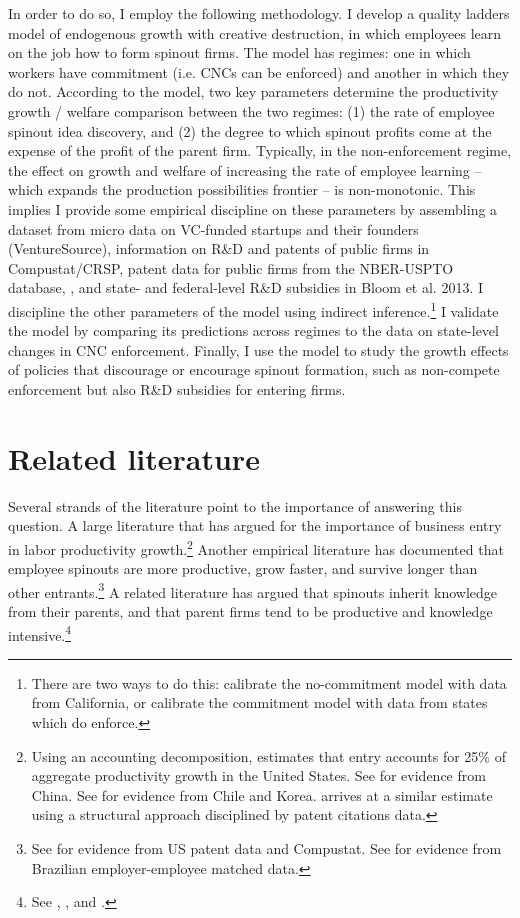\documentclass[11pt,english]{article}
\theoremstyle{remark}
\begin{document}
In order to do so, I employ the following methodology. I develop a quality ladders model of endogenous growth with creative destruction, in which employees learn on the job how to form spinout firms. The model has regimes: one in which workers have commitment (i.e. CNCs can be enforced) and another in which they do not. According to the model, two key parameters determine the productivity growth / welfare comparison between the two regimes: (1) the rate of employee spinout idea discovery, and (2) the degree to which spinout profits come at the expense of the profit of the parent firm. Typically, in the non-enforcement regime, the effect on growth and welfare of increasing the rate of employee learning -- which expands the production possibilities frontier -- is non-monotonic. This implies  I provide some empirical discipline on these parameters by assembling a dataset from micro data on VC-funded startups and their founders (VentureSource), information on R\&D and patents of public firms in Compustat/CRSP, patent data for public firms from the NBER-USPTO database, , and state- and federal-level R\&D subsidies in Bloom et al. 2013. I discipline the other parameters of the model using indirect inference.\footnote{There are two ways to do this: calibrate the no-commitment model with data from California, or calibrate the commitment model with data from states which do enforce.} I validate the model by comparing its predictions across regimes to the data on state-level changes in CNC enforcement. Finally, I use the model to study the growth effects of policies that discourage or encourage spinout formation, such as non-compete enforcement but also R\&D subsidies for entering firms.

\section{Related literature}

Several strands of the literature point to the importance of answering this question. A large literature that has argued for the importance of business entry in labor productivity growth.\footnote{Using an accounting decomposition, \cite{foster_aggregate_2001} estimates that entry accounts for 25\% of aggregate productivity growth in the United States. See \cite{brandt_creative_2012} for evidence from China. See \cite{asturias_firm_2019} for evidence from Chile and Korea. \cite{akcigit_growth_2018} arrives at a similar estimate using a structural approach disciplined by patent citations data.} Another empirical literature has documented that employee spinouts are more productive, grow faster, and survive longer than other entrants.\footnote{See \cite{baslandze_spinout_2019} for evidence from US patent data and Compustat. See \cite{muendler_employee_2012} for evidence from Brazilian employer-employee matched data.} A related literature has argued that spinouts inherit knowledge from their parents, and that parent firms tend to be productive and knowledge intensive.\footnote{See \cite{klepper_entry_2005}, \cite{gompers_entrepreneurial_2005}, and \cite{baslandze_spinout_2019}.} 
\end{document}
